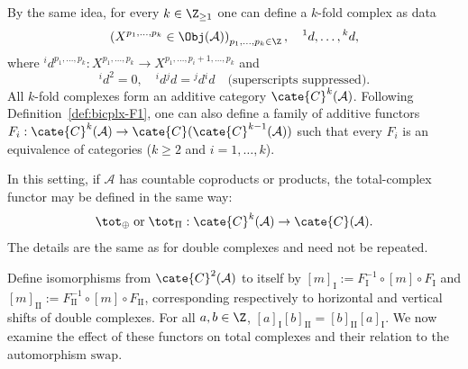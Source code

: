 \begin{remark}\label{rem:k-fold-cplx}
	By the same idea, for every $k\in\Z_{\geq1}$ one can define a $k$-fold
	complex as data
	\[ \left( X^{p_1, \ldots, p_k} \in \Obj(\mathcal{A}) \right)_{p_1, \ldots, p_k \in \Z}, \quad {}^1 d, \ldots, {}^k d, \]
	where ${}^i d^{p_1,\ldots,p_k}:X^{p_1,\ldots,p_k}\to
	X^{p_1,\ldots,p_i+1,\ldots,p_k}$ and
	\[ {}^i d^2 = 0, \quad {}^i d {}^j d = {}^j d {}^i d \quad \text{(superscripts suppressed)}. \]
	All $k$-fold complexes form an additive category
	$\cate{C}^k(\mathcal{A})$. Following Definition~\ref{def:bicplx-F1}, one
	can also define a family of additive functors
	$F_i:\cate{C}^k(\mathcal{A})\to
	\cate{C}(\cate{C}^{k-1}(\mathcal{A}))$ such that every $F_i$ is an
	equivalence of categories ($k\geq2$ and $i=1,\ldots,k$).

	In this setting, if $\mathcal{A}$ has countable coproducts or products,
	the total-complex functor may be defined in the same way:
	\[ \tot_{\oplus} \; \text{or} \; \tot_{\Pi}: \cate{C}^k(\mathcal{A}) \to \cate{C}(\mathcal{A}). \]
	The details are the same as for double complexes and need not be repeated.
\end{remark}

Define isomorphisms from $\cate{C}^2(\mathcal{A})$ to itself by
$[m]_{\mathrm{I}}:=F_{\mathrm{I}}^{-1}\circ[m]\circ F_{\mathrm{I}}$ and
$[m]_{\mathrm{II}}:=F_{\mathrm{II}}^{-1}\circ[m]\circ F_{\mathrm{II}}$,
corresponding respectively to horizontal and vertical shifts of double
complexes. For all $a,b\in\Z$,
$[a]_{\mathrm{I}}[b]_{\mathrm{II}}=[b]_{\mathrm{II}}[a]_{\mathrm{I}}$.
We now examine the effect of these functors on total complexes and their
relation to the automorphism $\mathrm{swap}$.


